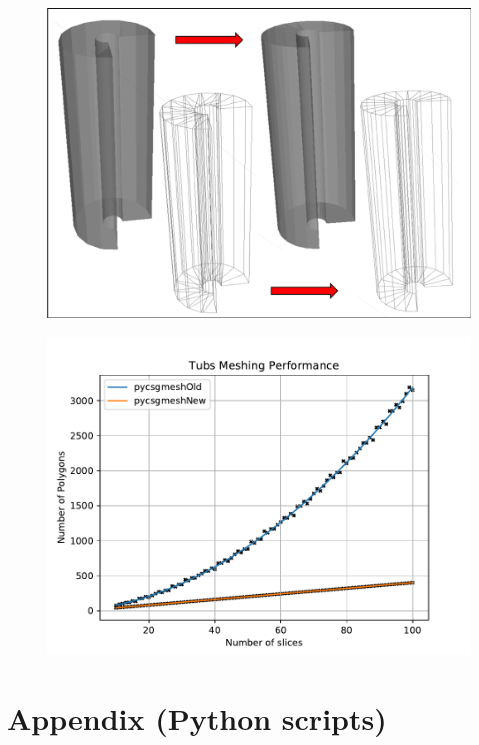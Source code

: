 \documentclass[12pt,a4paper]{article}
\begin{document}
\begin{figure}[h!]
\centering
\begin{minipage}{.2\textwidth}
  \centering
  \includegraphics[height=0.7\linewidth]{Images//Meshes//tubs.png}
  \label{fig:test1}
\end{minipage}%
\begin{minipage}{.3\textwidth}
  \centering
  \includegraphics[scale=0.35]{Images//Quad_fits//Tubs_quad.pdf}
  \label{fig:test2}
\end{minipage}%
\end{figure}

\endgroup
\onecolumn



\section{Appendix (Python scripts)}
\end{document}

